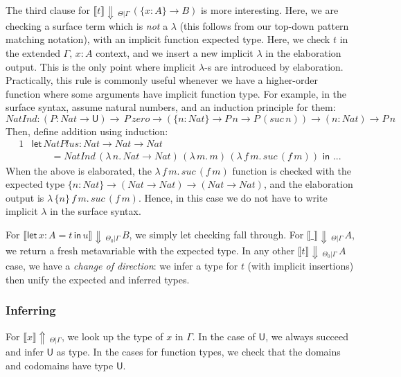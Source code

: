 \documentclass[acmsmall,review,anonymous,prologue,dvipsnames]{acmart}\settopmatter{printfolios=true,printccs=false,printacmref=false}
\newcommand{\slet}{\boldsymbol{\mathsf{let}}}
\renewcommand{\sin}{\boldsymbol{\mathsf{in}}}
\renewcommand{\U}{\mathsf{U}}
\newcommand{\mi}[1]{\mathit{#1}}
\newcommand{\echeck}[4]{\llbracket#1\rrbracket\!\Downarrow\,_{#2|#3}\,#4}
\newcommand{\einfer}[3]{\llbracket#1\rrbracket\!\Uparrow\,_{#2|#3}}
\theoremstyle{remark}
\begin{document}
The third clause for $\echeck{t}{\Theta}{\Gamma}{(\{x : A\}\to B)}$ is more
interesting. Here, we are checking a surface term which is \emph{not} a
$\lambda$ (this follows from our top-down pattern matching notation), with an
implicit function expected type. Here, we check $t$ in the extended $\Gamma,\,x
: A$ context, and we insert a new implicit $\lambda$ in the elaboration
output. This is the only point where implicit $\lambda$-s are introduced by
elaboration. Practically, this rule is commonly useful whenever we have a
higher-order function where some arguments have implicit function type. For
example, in the surface syntax, assume natural numbers, and an induction
principle for them:
\[
\mi{NatInd} : (P : \mi{Nat} \to \U)\to \,P\,\mi{zero} \to (\{n : \mi{Nat}\}\to P\,n \to
         P\,(\mi{suc}\,n)) \to (n : \mi{Nat}) \to P\,n
\]
Then, define addition using induction:
\begin{alignat*}{1}
& \slet\, \mi{NatPlus} : \mi{Nat} \to \mi{Nat} \to \mi{Nat}\\
& \qquad = \mi{NatInd}\,(\lambda\,n.\,\mi{Nat}\to \mi{Nat})\,(\lambda\,m.\,m)\,
                        (\lambda\,f\,m.\,\mi{suc}\,(f\,m))\,\,\sin\,\,...
\end{alignat*}
When the above is elaborated, the $\lambda\,f\,m.\,\mi{suc}\,(f\,m)$ function is
checked with the expected type $\{n : \mi{Nat}\}\to (\mi{Nat} \to \mi{Nat}) \to
(\mi{Nat} \to \mi{Nat})$, and the elaboration output is
$\lambda\,\{n\}\,f\,m.\,\mi{suc}\,(f\,m)$.  Hence, in this case we do not have
to write implicit $\lambda$ in the surface syntax.

For $\echeck{\slet\,x:A=t\,\sin\,u}{\Theta_0}{\Gamma}{B}$, we simply let
checking fall through. For $\echeck{\_}{\Theta}{\Gamma}{A}$, we return a fresh
metavariable with the expected type. In any other
$\echeck{t}{\Theta_0}{\Gamma}{A}$ case, we have a \emph{change of direction}: we
infer a type for $t$ (with implicit insertions) then unify the expected and
inferred types.

\subsubsection{Inferring}

For $\einfer{x}{\Theta}{\Gamma}$, we look up the type of $x$ in $\Gamma$. In the
case of $\U$, we always succeed and infer $\U$ as type. In the cases for
function types, we check that the domains and codomains have type $\U$.
\end{document}
